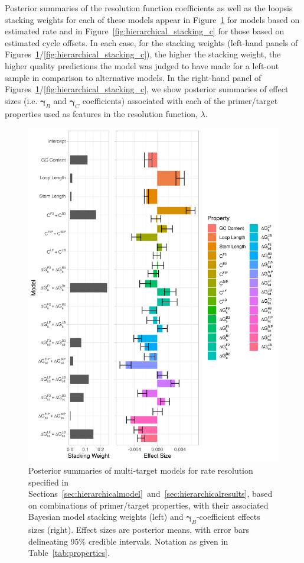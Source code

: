 \documentclass[../thesis.tex]{subfiles}
\begin{document}
Posterior summaries of the resolution function coefficients as well as the \gls{loopsis} stacking weights for each of these models appear in Figure~\ref{fig:hierarchical_stacking_b} for models based on estimated rate and in Figure~\ref{fig:hierarchical_stacking_c} for those based on estimated cycle offsets. In each case, for the stacking weights (left-hand panels of Figures~\ref{fig:hierarchical_stacking_b}/\ref{fig:hierarchical_stacking_c}), the higher the stacking weight, the higher quality predictions the model was judged to have made for a left-out sample in comparison to alternative models. In the right-hand panel of Figures~\ref{fig:hierarchical_stacking_b}/\ref{fig:hierarchical_stacking_c}, we show posterior summaries of effect sizes (i.e. $\bm{\gamma}_B$ and $\bm{\gamma}_C$ coefficients) associated with each of the primer/target properties used as features in the resolution function, $\lambda$. 

\begin{figure}[!tpb] 
\centering
\includegraphics[width=5in]{../figures/chapter2/bhm_eval_fig.png}
\caption{Posterior summaries of multi-target models for rate resolution specified in Sections~\ref{sec:hierarchicalmodel}~and~\ref{sec:hierarchicalresults}, based on combinations of primer/target properties, with their associated Bayesian model stacking weights (left) and $\bm{\gamma}_B$-coefficient effects sizes (right). Effect sizes are posterior means, with error bars delineating 95\% credible intervals. Notation as given in Table~\ref{tab:properties}.\label{fig:hierarchical_stacking_b}}
\end{figure}
\end{document}
